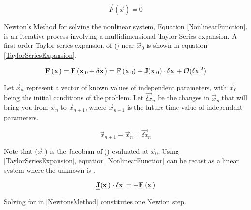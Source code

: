 \begin{equation}
\label{NonlinearFunction}
\Vec{F}(\Vec{x}) = 0
\end{equation}


Newton's Method for solving the nonlinear system, Equation \eqref{NonlinearFunction}, is an iterative process involving a multidimensional Taylor Series expansion.
A first order Taylor series expansion of () near $\Vec{x}_0$ is shown in equation \eqref{TaylorSeriesExpansion}.

\begin{equation}
\label{TaylorSeriesExpansion}
\Vec{F}(\Vec{x}) = \Vec{F}(\Vec{x}_0+\Vec{\delta x})= \Vec{F}(\Vec{x}_0)+\Mat{J}(\Vec{x}_0)\cdot\Vec{\delta x}+\mathcal{O}(\Vec{\delta x}^2)
\end{equation}

Let $\Vec{x}_n$ represent a vector of known values of independent parameters, with $\Vec{x}_0$ being the initial conditions of the problem.
Let $\Vec{\delta x}_n$ be the changes in $\Vec{x}_n$ that will bring you from $\Vec{x}_n$ to $\Vec{x}_{n+1}$, where $\Vec{x}_{n+1}$ is the future time value of independent parameters.

\begin{equation}
\label{DeltaX}
\Vec{x}_{n+1} = \Vec{x}_n + \Vec{\delta x}_n
\end{equation}

Note that ($\Vec{x}_0$) is the Jacobian of () evaluated at $\Vec{x}_0$. 
Using \eqref{TaylorSeriesExpansion}, equation \eqref{NonlinearFunction} can be recast as a linear system where the unknown is .

\begin{equation}
\label{NewtonsMethod}
\Mat{J}(\Vec{x})\cdot\Vec{\delta x} = -\Vec{F}(\Vec{x})
\end{equation}

Solving for  in \eqref{NewtonsMethod} constitutes one Newton step.

